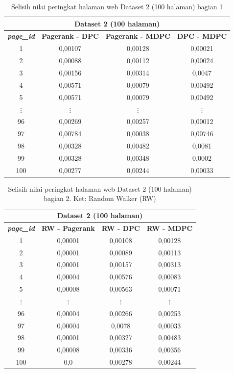 \begin{longtable}{|c|c|c|c|}
	\caption{Selisih nilai peringkat halaman web Dataset 2 (100 halaman) bagian 1}
	\label{table:rank_value_difference_dataset_2_part_1} \\
	\hline
	\multicolumn{4}{|c|}{Dataset 2 (100 halaman)} \\
	\hline
	\textbf{\textit{page\_id}} & \textbf{Pagerank - DPC} & \textbf{Pagerank - MDPC} & \textbf{DPC - MDPC} \\
	\hline
	1 & 0,00107 & 0,00128 & 0,00021  \\
	2 & 0,00088 & 0,00112 & 0,00024  \\
	3 & 0,00156 & 0,00314 & 0,0047  \\
	4 & 0,00571 & 0,00079 & 0,00492  \\
	5 & 0,00571 & 0,00079 & 0,00492  \\
	$\vdots$ & $\vdots$ & $\vdots$ & $\vdots$ \\
	96 & 0,00269 & 0,00257 & 0,00012  \\
	97 & 0,00784 & 0,00038 & 0,00746  \\
	98 & 0,00328 & 0,00482 & 0,0081  \\
	99 & 0,00328 & 0,00348 & 0,0002  \\
	100 & 0,00277 & 0,00244 & 0,00033  \\
	\hline
\end{longtable}

\begin{longtable}{|c|c|c|c|}
	\caption{Selisih nilai peringkat halaman web Dataset 2 (100 halaman) bagian 2. Ket: Random Walker (RW)}
	\label{table:rank_value_difference_dataset_2_part_2} \\
	\hline
	\multicolumn{4}{|c|}{Dataset 2 (100 halaman)} \\
	\hline
	\textbf{\textit{page\_id}} & \textbf{RW - Pagerank} & \textbf{RW - DPC} & \textbf{RW - MDPC} \\
	\hline
	1 & 0,00001 & 0,00108 & 0,00128  \\
	2 & 0,00001 & 0,00089 & 0,00113  \\
	3 & 0,00001 & 0,00157 & 0,00313  \\
	4 & 0,00004 & 0,00576 & 0,00083  \\
	5 & 0,00008 & 0,00563 & 0,00071  \\
	$\vdots$ & $\vdots$ & $\vdots$ & $\vdots$ \\
	96 & 0,00004 & 0,00266 & 0,00253  \\
	97 & 0,00004 & 0,0078 & 0,00033  \\
	98 & 0,00001 & 0,00327 & 0,00483  \\
	99 & 0,00008 & 0,00336 & 0,00356  \\
	100 & 0,0 & 0,00278 & 0,00244  \\
	\hline
\end{longtable}

